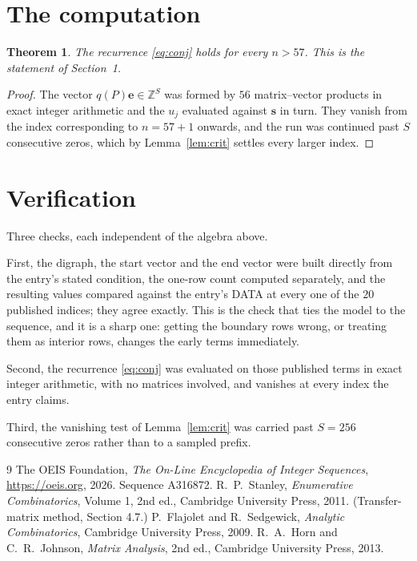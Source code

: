 \documentclass[11pt,a4paper]{article}
\theoremstyle{plain}
\newtheorem{theorem}{Theorem}
\theoremstyle{definition}
\begin{document}
\section{The computation}

\begin{theorem}
The recurrence \eqref{eq:conj} holds for every $n>57$. This is the statement of
Section~1.
\end{theorem}

\begin{proof}
The vector $q(P)\mathbf{e}\in\mathbb{Z}^{S}$ was formed by $56$ matrix--vector
products in exact integer arithmetic and the $u_j$ evaluated against $\mathbf{s}$ in turn.
They vanish from the index corresponding to $n=57+1$ onwards, and the run was continued
past $S$ consecutive zeros, which by Lemma~\ref{lem:crit} settles every larger index.
\end{proof}

\section{Verification}

Three checks, each independent of the algebra above.

First, the digraph, the start vector and the end vector were built directly from the
entry's stated condition, the one-row count computed separately, and the resulting values
compared against the entry's DATA at every one of the $20$ published indices; they
agree exactly. This is the check that ties the model to the sequence, and it is a sharp one:
getting the boundary rows wrong, or treating them as interior rows, changes the early terms
immediately.

Second, the recurrence \eqref{eq:conj} was evaluated on those published terms in exact
integer arithmetic, with no matrices involved, and vanishes at every index the entry claims.

Third, the vanishing test of Lemma~\ref{lem:crit} was carried past $S=256$ consecutive
zeros rather than to a sampled prefix.

\begin{thebibliography}{9}
 The OEIS Foundation, \emph{The On-Line Encyclopedia of Integer
Sequences}, \url{https://oeis.org}, 2026. Sequence A316872.
 R.~P.~Stanley, \emph{Enumerative Combinatorics}, Volume 1, 2nd ed.,
Cambridge University Press, 2011. (Transfer-matrix method, Section 4.7.)
 P.~Flajolet and R.~Sedgewick, \emph{Analytic Combinatorics}, Cambridge
University Press, 2009.
 R.~A.~Horn and C.~R.~Johnson, \emph{Matrix Analysis}, 2nd ed., Cambridge
University Press, 2013.
\end{thebibliography}
\end{document}
